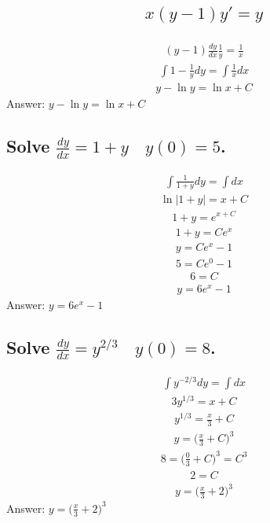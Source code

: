 \documentclass{article}
\begin{document}
\subsection{
	\begin{align*}
		x(y - 1)y' = y
	\end{align*}
}
\begin{align*}
	(y - 1) \frac{dy}{dx} \frac{1}{y} = \frac{1}{x}
\end{align*}
\begin{align*}
	\int {1 - \frac{1}{y}}dy = \int {\frac{1}{x}} dx
\end{align*}
\begin{align*}
	y - \ln{y} = \ln{x} + C
\end{align*}
Answer: $y - \ln{y} = \ln{x} + C$

\subsection{Solve $\frac{dy}{dx} = 1 + y \quad y(0) = 5$.}
\begin{align*}
	\int {\frac{1}{1 + y}}dy = \int dx
\end{align*}
\begin{align*}
	\ln{|1 + y|} = x + C
\end{align*}
\begin{align*}
	1 + y = e^{x + C}
\end{align*}
\begin{align*}
	1 + y = Ce^x
\end{align*}
\begin{align*}
	y = Ce^x - 1
\end{align*}
\begin{align*}
	5 = Ce^0 - 1
\end{align*}
\begin{align*}
	6 = C
\end{align*}
\begin{align*}
	y = 6e^x - 1
\end{align*}
Answer: $y = 6e^x - 1$

\subsection{Solve $\frac{dy}{dx} = y^{2/3} \quad y(0) = 8$.}
\begin{align*}
	\int {y^{-2/3}}dy = \int dx
\end{align*}
\begin{align*}
	3y^{1/3} = x + C
\end{align*}
\begin{align*}
	y^{1/3} = \frac{x}{3} + C
\end{align*}
\begin{align*}
	y = \bigg( \frac{x}{3} + C \bigg)^3
\end{align*}
\begin{align*}
	8 = \bigg( \frac{0}{3} + C \bigg)^3 = C^3
\end{align*}
\begin{align*}
	2 = C
\end{align*}
\begin{align*}
	y = \bigg( \frac{x}{3} + 2 \bigg)^3
\end{align*}
Answer: $y = \bigg( \frac{x}{3} + 2 \bigg)^3$
\end{document}
